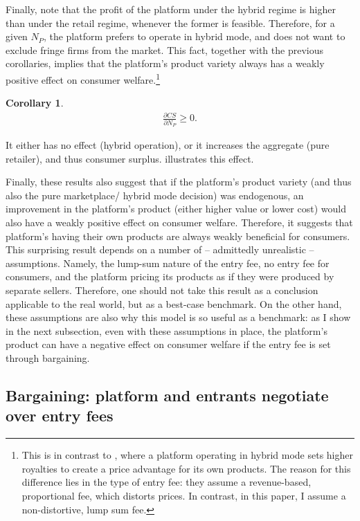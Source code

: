 \documentclass[a4paper]{article}
\newtheorem{corollary}{Corollary}
\begin{document}
Finally, note that the profit of the platform under the hybrid regime is higher than under the retail regime, whenever the former is feasible.
Therefore, for a given $N_P$, the platform prefers to operate in hybrid mode, and does not want to exclude fringe firms from the market.
This fact, together with the previous corollaries, implies that the platform's product variety always has a weakly positive effect on consumer welfare.\footnote{
    This is in contrast to \textcite{anderson2021hybrid}, where a platform operating in hybrid mode sets higher royalties to create a price advantage for its own products.
    The reason for this difference lies in the type of entry fee: they assume a revenue-based, proportional fee, which distorts prices.
    In contrast, in this paper, I assume a non-distortive, lump sum fee.
}
\begin{corollary}
    \begin{align*}
        \frac{\partial CS}{\partial N_P} \geq 0.
    \end{align*}
\end{corollary}
It either has no effect (hybrid operation), or it increases the aggregate (pure retailer), and thus consumer surplus.
 illustrates this effect.

Finally, these results also suggest that if the platform's product variety (and thus also the pure marketplace/ hybrid mode decision) was endogenous, an improvement in the platform's product (either higher value or lower cost) would also have a weakly positive effect on consumer welfare.
Therefore, it suggests that platform's having their own products are always weakly beneficial for consumers.
This surprising result depends on a number of -- admittedly unrealistic -- assumptions.
Namely, the lump-sum nature of the entry fee, no entry fee for consumers, and the platform pricing its products as if they were produced by separate sellers.
Therefore, one should not take this result as a conclusion applicable to the real world, but as a best-case benchmark.
On the other hand, these assumptions are also why this model is so useful as a benchmark: as I show in the next subsection, even with these assumptions in place, the platform's product can have a negative effect on consumer welfare if the entry fee is set through bargaining.

\subsection{Bargaining: platform and entrants negotiate over entry fees}
\end{document}
